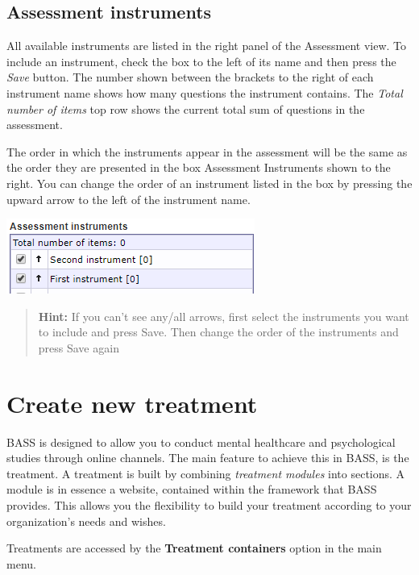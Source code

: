 \documentclass[]{book}
\begin{document}
\hypertarget{assessment-instruments}{%
\section{Assessment instruments}\label{assessment-instruments}}

All available instruments are listed in the right panel of the Assessment view. To include an instrument, check the box to the left of its name and then press the \emph{Save} button. The number shown between the brackets to the right of each instrument name shows how many questions the instrument contains. The \emph{Total number of items} top row shows the current total sum of questions in the assessment.

The order in which the instruments appear in the assessment will be the same as the order they are presented in the box Assessment Instruments shown to the right. You can change the order of an instrument listed in the box by pressing the upward arrow to the left of the instrument name.

\includegraphics{images/assessment-instrument.png}

\begin{quote}
\textbf{Hint:} If you can't see any/all arrows, first select the instruments you want to include and press Save. Then change the order of the instruments and press Save again
\end{quote}

\hypertarget{create-new-treatment}{%
\chapter{Create new treatment}\label{create-new-treatment}}

BASS is designed to allow you to conduct mental healthcare and psychological studies through online channels. The main feature to achieve this in BASS, is the treatment.
A treatment is built by combining \emph{treatment modules} into sections. A module is in essence a website, contained within the framework that BASS provides. This allows you the flexibility to build your treatment according to your organization's needs and wishes.

Treatments are accessed by the \textbf{Treatment containers} option in the main menu.
\end{document}
